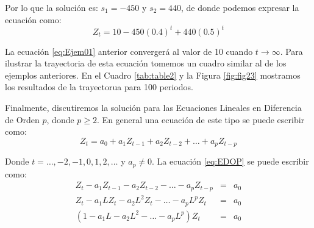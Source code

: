 \documentclass[
]{book}
\begin{document}
Por lo que la solución es: \(s_1 = -450\) y \(s_2 = 440\), de donde podemos expresar la ecuación como:
\begin{equation}
    Z_t = 10 - 450(0.4)^t + 440(0.5)^t
\label{eq:Ejem01}
\end{equation}

La ecuación \eqref{eq:Ejem01} anterior convergerá al valor de 10 cuando \(t \rightarrow \infty\). Para ilustrar la trayectoria de esta ecuación tomemos un cuadro similar al de los ejemplos anteriores. En el Cuadro \ref{tab:table2} y la Figura \ref{fig:fig23} mostramos los resultados de la trayectorua para 100 periodos.

Finalmente, discutiremos la solución para las Ecuaciones Lineales en Diferencia de Orden \(p\), donde \(p \geq 2\). En general una ecuación de este tipo se puede escribir como:
\begin{equation}
    Z_t = a_0 + a_1 Z_{t-1} + a_2 Z_{t-2} + \ldots + a_p Z_{t-p}
    \label{eq:EDOP}
\end{equation}

Donde \(t = \ldots, -2, -1, 0, 1, 2, \ldots\) y \(a_p \neq 0\). La ecuación \eqref{eq:EDOP} se puede escribir como:
\begin{eqnarray}
    Z_t - a_1 Z_{t-1} - a_2 Z_{t-2} - \ldots - a_p Z_{t-p} & = & a_0 \nonumber \\
    Z_t - a_1 L Z_t - a_2 L^2 Z_t - \ldots - a_p L^p Z_t & = & a_0 \nonumber \\
    (1 - a_1 L - a_2 L^2 - \ldots - a_p L^p) Z_t & = & a_0
    \label{eq:EDOP2}
\end{eqnarray}
\end{document}
